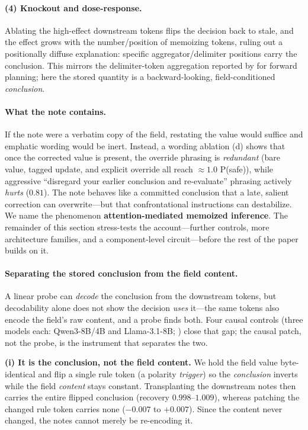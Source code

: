\paragraph{(4) Knockout and dose-response.} Ablating the high-effect downstream tokens flips the decision
back to stale, and the effect grows with the number/position of memoizing tokens, ruling out a positionally
diffuse explanation: specific aggregator/delimiter positions carry the conclusion. This mirrors the delimiter-token
aggregation reported by \citet{lindsey2025biology} for forward planning; here the stored quantity is a
backward-looking, field-conditioned \emph{conclusion}.

\paragraph{What the note contains.} If the note were a verbatim copy of the field, restating the value
would suffice and emphatic wording would be inert. Instead, a wording ablation (d) shows
that once the corrected value is present, the override phrasing is \emph{redundant} (bare value, tagged
update, and explicit override all reach $\approx 1.0$ P(safe)), while aggressive ``disregard your earlier
conclusion and re-evaluate'' phrasing actively \emph{hurts} ($0.81$). The note behaves like a committed
conclusion that a late, salient correction can overwrite---but that confrontational instructions can
destabilize. We name the phenomenon \textbf{attention-mediated memoized inference}. The remainder of this
section stress-tests the account---further controls, more architecture families, and a component-level
circuit---before the rest of the paper builds on it.

\paragraph{Separating the stored conclusion from the field content.} A linear probe can \emph{decode} the
conclusion from the downstream tokens, but decodability alone does not show the decision \emph{uses} it---the
same tokens also encode the field's raw content, and a probe finds both. Four causal controls (three models
each: Qwen3-8B/4B and Llama-3.1-8B; ) close that gap; the causal patch, not the probe, is
the instrument that separates the two.

\textbf{(i) It is the conclusion, not the field content.} We hold the field value byte-identical and flip a
single rule token (a polarity \emph{trigger}) so the \emph{conclusion} inverts while the field \emph{content}
stays constant. Transplanting the downstream notes then carries the entire flipped conclusion (recovery
$0.998$--$1.009$), whereas patching the changed rule token carries none ($-0.007$ to $+0.007$). Since the
content never changed, the notes cannot merely be re-encoding it.


